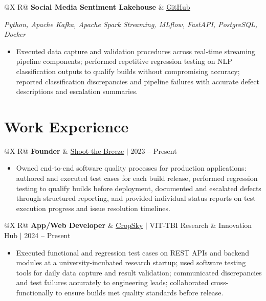 \documentclass[a4paper,10pt]{article}
\newcommand{\ulink}[2]{\href{#1}{\uline{#2}}}
\newcommand{\subheading}[1]{{\color[HTML]{0A0A0A}\fontsize{12}{14}\selectfont\bfseries #1}}
\newcommand{\techstack}[1]{{\color[HTML]{5C5C5C}\fontsize{10.5}{12.5}\selectfont\itshape #1}}
\newcommand{\meta}[1]{{\color[HTML]{5C5C5C}\fontsize{10.5}{12.5}\selectfont #1}}
\begin{document}
\begin{tabularx}{\linewidth}{@{}X R@{}}
\subheading{Social Media Sentiment Lakehouse} & \meta{\ulink{https://github.com/su-jin1425/Social-Media-Sentiment-Lakehouse}{GitHub}}
\end{tabularx}
\vspace{1pt}
\techstack{Python, Apache Kafka, Apache Spark Streaming, MLflow, FastAPI, PostgreSQL, Docker}
\begin{itemize}[nosep, leftmargin=1.5em, itemsep=1pt, topsep=2pt]
\item {\color[HTML]{0A0A0A}\fontsize{11}{14}\selectfont
Executed data capture and validation procedures across real-time streaming pipeline components; performed repetitive regression testing on NLP classification outputs to qualify builds without compromising accuracy; reported classification discrepancies and pipeline failures with accurate defect descriptions and escalation summaries.}
\end{itemize}

\vspace{2pt}

\section{Work Experience}
\vspace{2pt}

\begin{tabularx}{\linewidth}{@{}X R@{}}
\subheading{Founder} & \meta{\ulink{https://shoot-the-breeze.vercel.app}{Shoot the Breeze} $|$ 2023 -- Present}
\end{tabularx}
\begin{itemize}[nosep, leftmargin=1.5em, itemsep=1pt, topsep=2pt]
\item {\color[HTML]{0A0A0A}\fontsize{11}{14}\selectfont
Owned end-to-end software quality processes for production applications: authored and executed test cases for each build release, performed regression testing to qualify builds before deployment, documented and escalated defects through structured reporting, and provided individual status reports on test execution progress and issue resolution timelines.}
\end{itemize}

\vspace{4pt}

\begin{tabularx}{\linewidth}{@{}X R@{}}
\subheading{App/Web Developer} & \meta{\ulink{https://sites.google.com/view/cropsky/home}{CropSky} $|$ VIT-TBI Research \& Innovation Hub $|$ 2024 -- Present}
\end{tabularx}
\begin{itemize}[nosep, leftmargin=1.5em, itemsep=1pt, topsep=2pt]
\item {\color[HTML]{0A0A0A}\fontsize{11}{14}\selectfont
Executed functional and regression test cases on REST APIs and backend modules at a university-incubated research startup; used software testing tools for daily data capture and result validation; communicated discrepancies and test failures accurately to engineering leads; collaborated cross-functionally to ensure builds met quality standards before release.}
\end{itemize}
\end{document}
